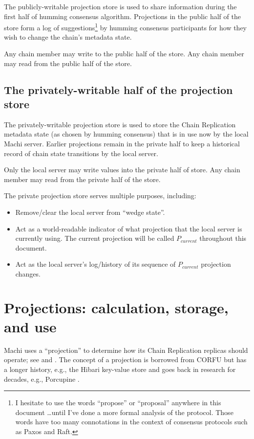 \documentclass[preprint,10pt]{sigplanconf}
\begin{document}
The publicly-writable projection store is used to share information
during the first half of humming consensus algorithm.  Projections
in the public half of the store form a log of
suggestions\footnote{I hesitate to use the words ``propose'' or ``proposal''
  anywhere in this document \ldots until I've done a more formal
  analysis of the protocol.  Those words have too many connotations in
  the context of consensus protocols such as Paxos and Raft.}
by humming consensus participants for how they wish to change the
chain's metadata state.

Any chain member may write to the public half of the store.
Any chain member may read from the public half of the store.

\subsection{The privately-writable half of the projection store}

The privately-writable projection store is used to store the
Chain Replication metadata state (as chosen by humming consensus)
that is in use now by the local Machi server. Earlier projections
remain in the private half to keep a historical
record of chain state transitions by the local server.

Only the local server may write values into the private half of store.
Any chain member may read from the private half of the store.

The private projection store serves multiple purposes, including:

\begin{itemize}
\item Remove/clear the local server from ``wedge state''.
\item Act as a world-readable indicator of what projection that the
  local server is currently using.  The current projection will be
  called $P_{current}$ throughout this document.
\item Act as the local server's log/history of
  its sequence of $P_{current}$ projection changes.
\end{itemize}

\section{Projections: calculation, storage, and use}
\label{sec:projections}

Machi uses a ``projection'' to determine how its Chain Replication replicas
should operate; see \cite{machi-design} and \cite{corfu1}.
The concept of a projection is borrowed
from CORFU but has a longer history, e.g., the Hibari key-value store
\cite{cr-theory-and-practice} and goes back in research for decades,
e.g., Porcupine \cite{porcupine}.
\end{document}
